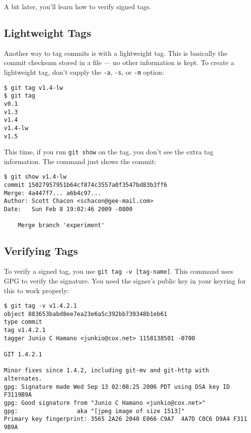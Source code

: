\documentclass[a4paper]{book}
\begin{document}
A bit later, you'll learn how to verify signed tags.

\subsection{Lightweight Tags}\label{lightweight-tags}

Another way to tag commits is with a lightweight tag. This is basically the commit checksum stored in a file --- no other information is kept. To create a lightweight tag, don't supply the \texttt{-a}, \texttt{-s}, or \texttt{-m} option:

\begin{shaded}\begin{verbatim}
$ git tag v1.4-lw
$ git tag
v0.1
v1.3
v1.4
v1.4-lw
v1.5
\end{verbatim}\end{shaded}

This time, if you run \texttt{git show} on the tag, you don't see the extra tag information. The command just shows the commit:

\begin{shaded}\begin{verbatim}
$ git show v1.4-lw
commit 15027957951b64cf874c3557a0f3547bd83b3ff6
Merge: 4a447f7... a6b4c97...
Author: Scott Chacon <schacon@gee-mail.com>
Date:   Sun Feb 8 19:02:46 2009 -0800

    Merge branch 'experiment'
\end{verbatim}\end{shaded}

\subsection{Verifying Tags}\label{verifying-tags}

To verify a signed tag, you use \texttt{git tag -v {[}tag-name{]}}. This command uses GPG to verify the signature. You need the signer's public key in your keyring for this to work properly:

\begin{shaded}\begin{verbatim}
$ git tag -v v1.4.2.1
object 883653babd8ee7ea23e6a5c392bb739348b1eb61
type commit
tag v1.4.2.1
tagger Junio C Hamano <junkio@cox.net> 1158138501 -0700

GIT 1.4.2.1

Minor fixes since 1.4.2, including git-mv and git-http with alternates.
gpg: Signature made Wed Sep 13 02:08:25 2006 PDT using DSA key ID F3119B9A
gpg: Good signature from "Junio C Hamano <junkio@cox.net>"
gpg:                 aka "[jpeg image of size 1513]"
Primary key fingerprint: 3565 2A26 2040 E066 C9A7  4A7D C0C6 D9A4 F311 9B9A
\end{verbatim}\end{shaded}
\end{document}
